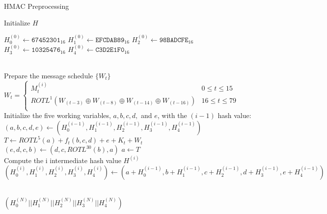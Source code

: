 \begin{algorithm}[H]
\caption{HMAC Preprocessing}\label{alg:hmac_pre}
\begin{algorithmic}[1]

\Statex   {} {Initialize $H$}

\State $H_0^{(0)} \gets \texttt{67452301}_{16}$ \label{hmac:init_H}
 \State $H_1^{(0)} \gets \texttt{EFCDAB89}_{16}$
\State  $H_2^{(0)} \gets \texttt{98BADCFE}_{16}$
 \State $H_3^{(0)} \gets \texttt{10325476}_{16}$
 \State $H_4^{(0)} \gets \texttt{C3D2E1F0}_{16}$

\\
    \Statex   {} {Prepare the message schedule $\{W_t\}$}
    \State $W_t =
    \begin{cases}
      M_t^{(i)} & \text{$0 \leq t \leq 15$}\\
      ROTL^1(W_(t-3)\oplus W_(t-8)\oplus W_(t-14)\oplus W_(t-16)) & \text{$16 \leq t \leq 79$}\\
    \end{cases}
    $\label{hmac:wt} \\


    \Statex   {} {Initialize the five working variables, $a, b, c, d,$ and $e$, with the $(i-1)$ hash value:}
    \State $(a,b,c,d,e) \gets (H_0^{(i-1)},H_1^{(i-1)},H_2^{(i-1)},H_3^{(i-1)},H_4^{(i-1)})$ \label{hmac:assign3}
        \State $T \gets ROTL^{5}(a)+f_t(b,c,d)+e+ K_t+ W_t$ \label{hmac:T}
        \State $(e,d,c,b) \gets (d,c,ROTL^{30}(b),a)$ \label{hmac:asign1}
        \State $a \gets T$
    \EndFor\\
    \Statex   {} {Compute the i intermediate hash value $H^{(i)}$}
    \State $(H_0^{(i)},H_1^{(i)}, H_2^{(i)}, H_3^{(i)}, H_4^{(i)}) \gets
            (a + H_0^{(i-1)},b + H_1^{(i-1)},c + H_2^{(i-1)},d + H_3^{(i-1)},e + H_4^{(i-1)})$



    \EndFor\\

    \State \Return $( H_0^{(N)} || H_1^{(N)} || H_2^{(N)} || H_3^{(N)} || H_4^{(N)} )$ \label{hmac:asign2}
\EndProcedure
\end{algorithmic}
\end{algorithm}


